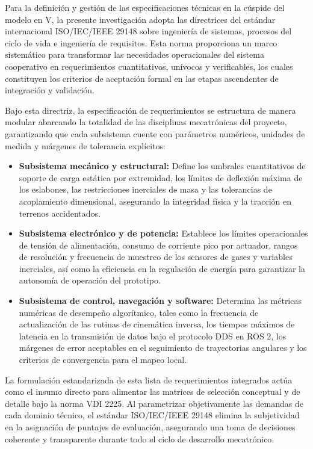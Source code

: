 \noindent
Para la definición y gestión de las especificaciones técnicas en la cúspide del modelo en V, la presente investigación adopta las directrices del estándar internacional ISO/IEC/IEEE 29148 sobre ingeniería de sistemas, procesos del ciclo de vida e ingeniería de requisitos. Esta norma proporciona un marco sistemático para transformar las necesidades operacionales del sistema cooperativo en requerimientos cuantitativos, unívocos y verificables, los cuales constituyen los criterios de aceptación formal en las etapas ascendentes de integración y validación.

\noindent
Bajo esta directriz, la especificación de requerimientos se estructura de manera modular abarcando la totalidad de las disciplinas mecatrónicas del proyecto, garantizando que cada subsistema cuente con parámetros numéricos, unidades de medida y márgenes de tolerancia explícitos:

\begin{itemize}
    \item \textbf{Subsistema mecánico y estructural:} Define los umbrales cuantitativos de soporte de carga estática por extremidad, los límites de deflexión máxima de los eslabones, las restricciones inerciales de masa y las tolerancias de acoplamiento dimensional, asegurando la integridad física y la tracción en terrenos accidentados.
    \item \textbf{Subsistema electrónico y de potencia:} Establece los límites operacionales de tensión de alimentación, consumo de corriente pico por actuador, rangos de resolución y frecuencia de muestreo de los sensores de gases y variables inerciales, así como la eficiencia en la regulación de energía para garantizar la autonomía de operación del prototipo.
    \item \textbf{Subsistema de control, navegación y software:} Determina las métricas numéricas de desempeño algorítmico, tales como la frecuencia de actualización de las rutinas de cinemática inversa, los tiempos máximos de latencia en la transmisión de datos bajo el protocolo DDS en ROS 2, los márgenes de error aceptables en el seguimiento de trayectorias angulares y los criterios de convergencia para el mapeo local.
\end{itemize}

\noindent
La formulación estandarizada de esta lista de requerimientos integrados actúa como el insumo directo para alimentar las matrices de selección conceptual y de detalle bajo la norma VDI 2225. Al parametrizar objetivamente las demandas de cada dominio técnico, el estándar ISO/IEC/IEEE 29148 elimina la subjetividad en la asignación de puntajes de evaluación, asegurando una toma de decisiones coherente y transparente durante todo el ciclo de desarrollo mecatrónico.


